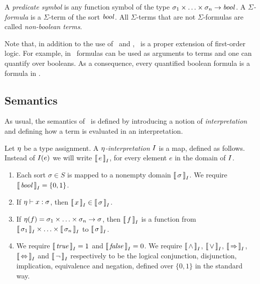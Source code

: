 \begin{definition}\rm
  A \emph{predicate symbol} is any function symbol of the type $\sigma_1 \times \ldots \times \sigma_n \to \mathit{bool}$.
  A \emph{$\Sigma$-formula} is a $\Sigma$-term of the sort $\mathit{bool}$. All $\Sigma$-terms that are not $\Sigma$-formulas are called \emph{non-boolean terms}. \QED
\end{definition}

Note that, in addition to the use of \LETIN\ and \ITE, \folb\ is a proper extension of first-order logic. For example, in \folb\ formulas can be used as arguments to terms and one can quantify over booleans. As a consequence, every quantified boolean formula is a formula in \folb.

\subsection{Semantics}

As usual, the semantics of \folb\ is defined by introducing a notion of \emph{interpretation} and defining how a term is evaluated in an interpretation.

\begin{definition}\label{def:folb-interpretation}\rm
  Let $\eta$ be a type assignment.
  A \emph{$\eta$-interpretation} $I$ is a map, defined as follows. Instead of $I(e)$ we will write $\left\llbracket\,{e}\,\right\rrbracket_{I}$, for every element $e$ in the domain of $I$.
  \begin{enumerate}
    \item Each sort $\sigma \in S$ is mapped to a nonempty domain $\left\llbracket\,{\sigma}\,\right\rrbracket_{I}$. We require $\left\llbracket\,{\mathit{bool}}\,\right\rrbracket_{I} = \left\{0, 1\right\}$.

    \item If $\eta \vdash x:\sigma$, then $\left\llbracket\,{x}\,\right\rrbracket_{I} \in \left\llbracket\,{\sigma}\,\right\rrbracket_{I}$.

    \item If $\eta(f) = \sigma_1 \times \ldots \times \sigma_n \to \sigma$, then $\left\llbracket\,{f}\,\right\rrbracket_{I}$ is a function from $\left\llbracket\,{\sigma_1}\,\right\rrbracket_{I} \times \ldots \times \left\llbracket\,{\sigma_n}\,\right\rrbracket_{I}$ to $\left\llbracket\,{\sigma}\,\right\rrbracket_{I}$.

    \item We require $\left\llbracket\,{\mathit{true}}\,\right\rrbracket_{I} = 1$ and $\left\llbracket\,{\mathit{false}}\,\right\rrbracket_{I} = 0$. We require $\left\llbracket\,{\wedge}\,\right\rrbracket_{I}$, $\left\llbracket\,{\vee}\,\right\rrbracket_{I}$, $\left\llbracket\,{\Rightarrow}\,\right\rrbracket_{I}$, $\left\llbracket\,{\Leftrightarrow}\,\right\rrbracket_{I}$ and $\left\llbracket\,{\neg}\,\right\rrbracket_{I}$ respectively to be the logical conjunction, disjunction, implication, equivalence and negation, defined over $\{0,1\}$ in the standard way. \QED
  \end{enumerate}
\end{definition}

